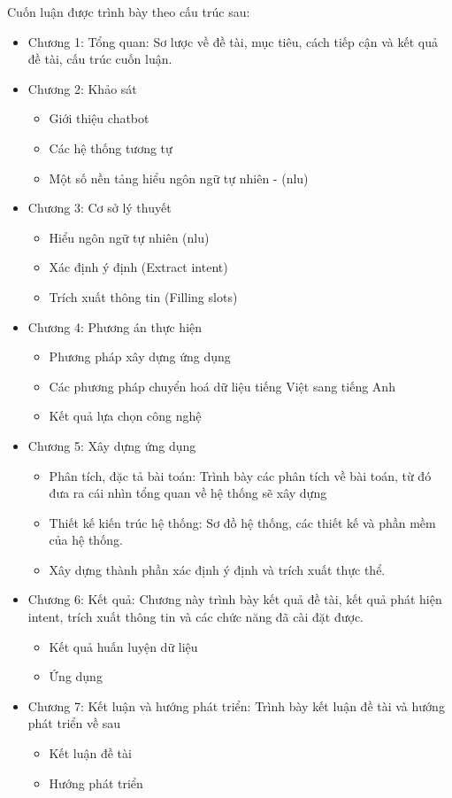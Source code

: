 Cuốn luận được trình bày theo cấu trúc sau:
\begin{itemize}
    \item Chương 1: Tổng quan: Sơ lược về đề tài, mục tiêu, cách tiếp cận và kết quả đề tài, cấu trúc cuốn luận.
    \item Chương 2: Khảo sát
          \begin{itemize}
              \item Giới thiệu chatbot
              \item Các hệ thống tương tự
              \item Một số nền tảng hiểu ngôn ngữ tự nhiên - (\ac{nlu})
          \end{itemize}
    \item Chương 3: Cơ sở lý thuyết
          \begin{itemize}
              \item Hiểu ngôn ngữ tự nhiên (\ac{nlu})
              \item Xác định ý định (Extract intent)
              \item Trích xuất thông tin (Filling slots)
          \end{itemize}
    \item Chương 4: Phương án thực hiện
    \begin{itemize}
        \item Phương pháp xây dựng ứng dụng
        \item Các phương pháp chuyển hoá dữ liệu tiếng Việt sang tiếng Anh
        \item Kết quả lựa chọn công nghệ
    \end{itemize}
    \item Chương 5: Xây dựng ứng dụng
          \begin{itemize}
              \item Phân tích, đặc tả bài toán: Trình bày các phân tích về bài toán, từ đó đưa ra cái nhìn tổng quan về hệ thống sẽ xây dựng
              \item Thiết kế kiến trúc hệ thống: Sơ đồ hệ thống, các thiết kế và phần mềm của hệ thống.
              \item Xây dựng thành phần xác định ý định và trích xuất thực thể.
          \end{itemize}
    \item Chương 6: Kết quả: Chương này trình bày kết quả đề tài, kết quả phát hiện intent, trích xuất thông tin và các chức năng đã cài đặt được.
          \begin{itemize}
              \item Kết quả huấn luyện dữ liệu 
              \item Ứng dụng
          \end{itemize}
    \item Chương 7: Kết luận và hướng phát triển: Trình bày kết luận đề tài và hướng phát triển về sau
          \begin{itemize}
              \item Kết luận đề tài
              \item Hướng phát triển
          \end{itemize}
\end{itemize}